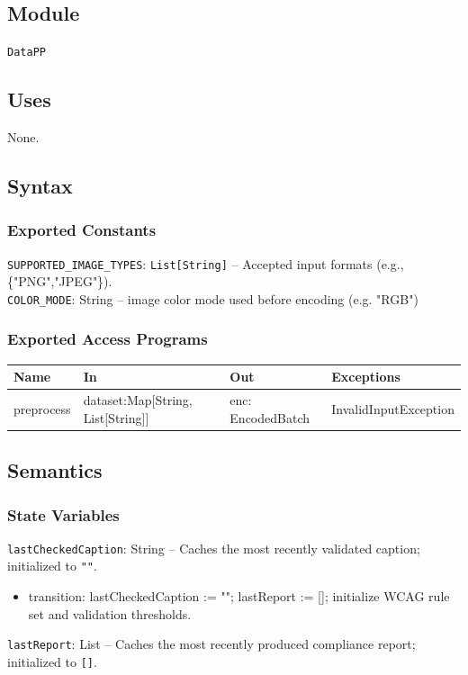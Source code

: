 \documentclass[12pt, titlepage]{article}
\begin{document}
\subsection{Module}
\texttt{DataPP}

\subsection{Uses}
None.

\subsection{Syntax}

\subsubsection{Exported Constants}
\texttt{SUPPORTED\_IMAGE\_TYPES}: \texttt{List[String]} -- Accepted input formats (e.g., \{"PNG","JPEG"\}).\\
\texttt{COLOR\_MODE}: String -- image color mode used before encoding (e.g. "RGB") 

\subsubsection{Exported Access Programs}
\begin{center}
  \begin{tabular}{p{2cm} p{4cm} p{4cm} p{4cm}}
  \hline
  \textbf{Name} & \textbf{In} & \textbf{Out} & \textbf{Exceptions} \\
  \hline
  preprocess & dataset:Map[String, List[String]] & enc: EncodedBatch & InvalidInputException \\
  \hline
  \end{tabular}
\end{center}

\subsection{Semantics}

\subsubsection{State Variables}
\texttt{lastCheckedCaption}: String -- Caches the most recently validated caption; initialized to \texttt{""}.\\
\begin{itemize}
  \item transition: lastCheckedCaption := ""; lastReport := []; initialize WCAG rule set and validation thresholds.
\end{itemize}
\texttt{lastReport}: List -- Caches the most recently produced compliance report; initialized to \texttt{[]}.
\end{document}
